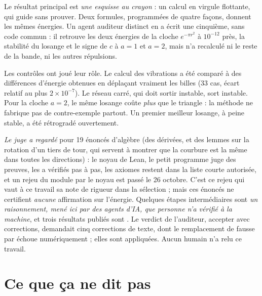 Le résultat principal est  \emph{une esquisse au crayon} : un calcul en virgule
flottante, qui guide sans prouver. Deux formules, programmées de quatre façons, donnent les
mêmes énergies. Un agent auditeur distinct en a écrit une cinquième, sans code commun : il
retrouve les deux énergies de la cloche $e^{-\pi r^2}$ à $10^{-12}$ près, la stabilité du
losange et le signe de $c$ à $a=1$ et $a=2$, mais n'a recalculé ni le reste de la bande, ni
les autres répulsions.

Les contrôles ont joué leur rôle. Le calcul des vibrations a été comparé à des différences
d'énergie obtenues en déplaçant vraiment les billes (33 cas, écart relatif au plus
$2\times10^{-7}$). Le réseau carré, qui doit sortir instable, sort instable. Pour la cloche
$a=2$, le même losange coûte \emph{plus} que le triangle : la méthode ne fabrique pas de
contre-exemple partout. Un premier \og meilleur\fg{} losange, à peine stable, a été
rétrogradé ouvertement.

 \emph{Le juge a regardé} pour 19 énoncés d'algèbre (des dérivées, et des lemmes sur
la rotation d'un tiers de tour, qui servent à montrer que la courbure est la même dans toutes
les directions) : le noyau de Lean,
le petit programme juge des preuves, les a vérifiés pas à pas, les axiomes restent dans la
liste courte autorisée, et un rejeu du module par le noyau est passé le 26 octobre. C'est ce
rejeu qui vaut à ce travail sa note de rigueur dans la sélection ; mais ces énoncés ne
certifient \emph{aucune} affirmation sur l'énergie. Quelques étapes intermédiaires sont
 \emph{un raisonnement, mené ici par des agents d'IA, que personne n'a vérifié à la
machine}, et trois résultats publiés sont . Le verdict de l'auditeur,
\og accepter avec corrections\fg{}, demandait cinq corrections de texte, dont le
remplacement de \og fausse\fg{} par \og échoue numériquement\fg{} ; elles sont appliquées.
Aucun humain n'a relu ce travail.

\section*{Ce que ça ne dit pas}

